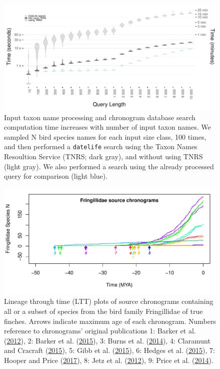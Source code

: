 \begin{figure}[!h]
\includegraphics[width=1\linewidth]{../figures/fig_runtime_main.pdf}
\caption{Input taxon name processing and chronogram database search computation time increases with number of input taxon names. We sampled N bird species names for each input size class, 100 times, and then performed a \texttt{datelife} search using the Taxon Names Resoultion Service (TNRS; dark gray), and without using TNRS (light gray). We also performed a search using the already processed query for comparison (light blue).}
\label{fig:runtime1}
\end{figure}
%
\newpage
\begin{figure}[!h]
\includegraphics[width=1\linewidth]{../figures/fig_schronograms1.pdf}
\caption{Lineage through time (LTT) plots of source chronograms containing all or a subset of species from the bird family Fringillidae of true finches. Arrows indicate maximum age of each chronogram. Numbers reference to chronograms' original publications 1: Barker et al. (\protect\hyperlink{ref-barker2012going}{2012}), 2: Barker et al. (\protect\hyperlink{ref-barker2015new}{2015}), 3: Burns et al. (\protect\hyperlink{ref-burns2014phylogenetics}{2014}), 4: Claramunt and Cracraft (\protect\hyperlink{ref-claramunt2015new}{2015}), 5: Gibb et al. (\protect\hyperlink{ref-gibb2015new}{2015}), 6: Hedges et al. (\protect\hyperlink{ref-Hedges2015}{2015}), 7: Hooper and Price (\protect\hyperlink{ref-hooper2017chromosomal}{2017}), 8: Jetz et al. (\protect\hyperlink{ref-Jetz2012}{2012}), 9: Price et al. (\protect\hyperlink{ref-price2014niche}{2014}).
}
\label{fig:schronograms1}
\end{figure}
